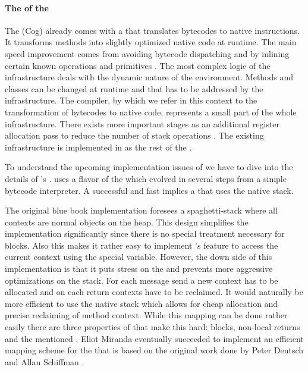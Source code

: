 \paragraph{The \JIT of the \PH \VM}
The \PH \VM (Cog) already comes with a \JIT that translates bytecodes to native instructions.
It transforms \ST methods into slightly optimized native code at runtime.
The main speed improvement comes from avoiding bytecode dispatching and by inlining certain known operations and primitives \cite{Ayco03a}.
The most complex logic of the \JIT infrastructure deals with the dynamic nature of the \ST environment.
Methods and classes can be changed at runtime and that has to be addressed by the \JIT infrastructure.
The \JIT compiler, by which we refer in this context to the transformation of bytecodes to native code, represents a small part of the whole infrastructure.
There exists more important stages as an additional register allocation pass to reduce the number of stack operations \cite{Mira99a,Mira11a}.
The existing \JIT infrastructure is implemented in \Slang \cite[Ch.\ 5]{Blac09a} as the rest of the \VM.

To understand the upcoming implementation issues of \NBJ we have to dive into the details of \PH's \JIT.
\PH uses a flavor of the \Cog \VM which evolved in several steps from a simple bytecode interpreter.
A successful and fast \JIT implies a \VM that uses the native stack.

The original  blue book implementation foresees a spa\-ghet\-ti-stack where all contexts are normal objects on the heap.
This design simplifies the \VM implementation significantly since there is no special treatment necessary for blocks.
Also this makes it rather easy to implement \PH's feature to access the current context using the special  variable.
However, the down side of this implementation is that it puts stress on the \GC and prevents more aggressive optimizations on the stack.
For each message send a new context has to be allocated and on each return contexts have to be reclaimed.
It would naturally be more efficient to use the native stack which allows for cheap allocation and precise reclaiming of method context.
While this mapping can be done rather easily there are three properties of \PH that make this hard: blocks, non-local returns and the mentioned .
Eliot Miranda eventually succeeded to implement an efficient mapping scheme for the \Cog \VM that is based on the original work done by Peter Deutsch and Allan Schiffman \cite{Deut84a}.

